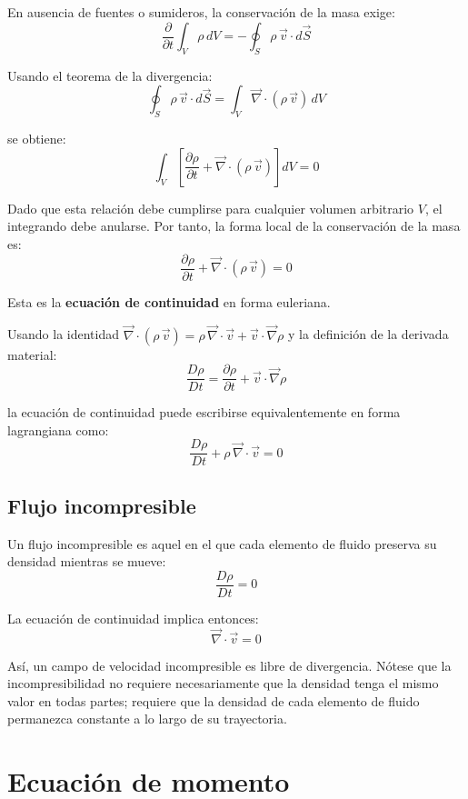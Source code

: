 En ausencia de fuentes o sumideros, la conservación de la masa exige:
$$
\frac{\partial}{\partial t}\int_V \rho\, dV = -\oint_S \rho\,\vec{v}\cdot d\vec{S}
$$

Usando el teorema de la divergencia:
$$
\oint_S \rho\,\vec{v}\cdot d\vec{S} = \int_V \vec{\nabla}\cdot(\rho\,\vec{v})\, dV
$$

se obtiene:
$$
\int_V \left[\frac{\partial \rho}{\partial t} + \vec{\nabla}\cdot(\rho\,\vec{v})\right] dV = 0
$$

Dado que esta relación debe cumplirse para cualquier volumen arbitrario $V$, el integrando debe anularse. Por tanto, la forma local de la conservación de la masa es:
$$
\boxed{\frac{\partial \rho}{\partial t} + \vec{\nabla}\cdot(\rho\,\vec{v}) = 0}
$$

Esta es la \textbf{ecuación de continuidad} en forma euleriana.

Usando la identidad $\vec{\nabla}\cdot(\rho\,\vec{v}) = \rho\,\vec{\nabla}\cdot\vec{v} + \vec{v}\cdot\vec{\nabla}\rho$ y la definición de la derivada material:
$$
\frac{D\rho}{Dt} = \frac{\partial \rho}{\partial t} + \vec{v}\cdot\vec{\nabla}\rho
$$

la ecuación de continuidad puede escribirse equivalentemente en forma lagrangiana como:
$$
\boxed{\frac{D\rho}{Dt} + \rho\,\vec{\nabla}\cdot\vec{v} = 0}
$$

\subsection{Flujo incompresible}

Un flujo incompresible es aquel en el que cada elemento de fluido preserva su densidad mientras se mueve:
$$
\frac{D\rho}{Dt} = 0
$$

La ecuación de continuidad implica entonces:
$$
\boxed{\vec{\nabla}\cdot\vec{v} = 0}
$$

Así, un campo de velocidad incompresible es libre de divergencia. Nótese que la incompresibilidad no requiere necesariamente que la densidad tenga el mismo valor en todas partes; requiere que la densidad de cada elemento de fluido permanezca constante a lo largo de su trayectoria.

\figuraFlujoIncompresible

\section{Ecuación de momento}

